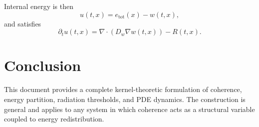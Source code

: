 \documentclass[11pt]{article}
\begin{document}
Internal energy is then
\[
u(t,x) = e_{\mathrm{tot}}(x) - w(t,x),
\]
and satisfies
\[
\partial_t u(t,x)
= \nabla \cdot (D_w \nabla w(t,x)) - R(t,x).
\]

\section{Conclusion}

This document provides a complete kernel-theoretic formulation of coherence, energy partition, radiation thresholds, and PDE dynamics. The construction is general and applies to any system in which coherence acts as a structural variable coupled to energy redistribution.
\end{document}
